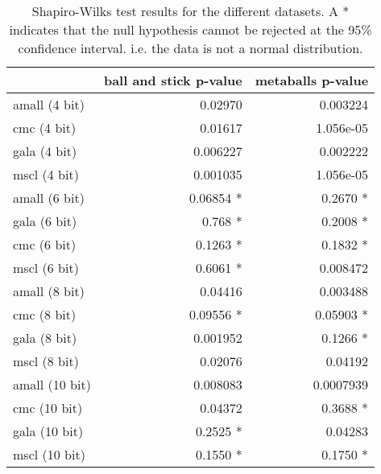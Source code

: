 \begin{table}
  \begin{tabular}{ | l | r | r | }
  \hline
                 & ball and stick p-value & metaballs p-value  \\ \hline
  amall (4 bit)  &                0.02970 &          0.003224  \\ \hline
  cmc (4 bit)    &                0.01617 &         1.056e-05  \\ \hline
  gala (4 bit)   &               0.006227 &          0.002222  \\ \hline
  mscl (4 bit)   &               0.001035 &         1.056e-05  \\ \hline
  \hline

  amall (6 bit)  &              0.06854 * &          0.2670 *  \\ \hline
  gala (6 bit)   &                0.768 * &          0.2008 *  \\ \hline
  cmc (6 bit)    &               0.1263 * &          0.1832 *  \\ \hline
  mscl (6 bit)   &               0.6061 * &          0.008472  \\ \hline
  \hline

  amall (8 bit)  &                0.04416 &          0.003488  \\ \hline
  cmc (8 bit)    &              0.09556 * &         0.05903 *  \\ \hline
  gala (8 bit)   &               0.001952 &          0.1266 *  \\ \hline
  mscl (8 bit)   &                0.02076 &           0.04192  \\ \hline
  \hline

  amall (10 bit) &               0.008083 &         0.0007939  \\ \hline
  cmc (10 bit)   &                0.04372 &          0.3688 *  \\ \hline
  gala (10 bit)  &               0.2525 * &           0.04283  \\ \hline
  mscl (10 bit)  &               0.1550 * &          0.1750 *  \\ \hline
  \end{tabular}
  \caption{Shapiro-Wilks test results for the different datasets. A *
  indicates that the null hypothesis cannot be rejected at the 95\% confidence
  interval. i.e. the data is not a normal distribution.}
  \label{tab:appendix_dataset_normality}
\end{table}


